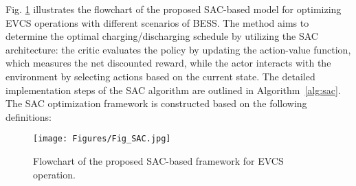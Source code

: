 \documentclass[10pt, journal]{IEEEtran}
\begin{document}
Fig. \ref{Fig_SAC} illustrates the flowchart of the proposed SAC-based model for optimizing EVCS operations with different scenarios of BESS. The method aims to determine the optimal charging/discharging schedule by utilizing the SAC architecture: the critic evaluates the policy by updating the action-value function, which measures the net discounted reward, while the actor interacts with the environment by selecting actions based on the current state. The detailed implementation steps of the SAC algorithm are outlined in Algorithm~\ref{alg:sac}.
The SAC optimization framework is constructed based on the following definitions:

{\setlength{\belowcaptionskip}{-7mm}
\begin{figure}[!t]
\centering
\texttt{[image: Figures/Fig\_SAC.jpg]}
\caption{Flowchart of the proposed SAC-based framework for EVCS operation.}
\label{Fig_SAC}
\end{figure}}
\end{document}
